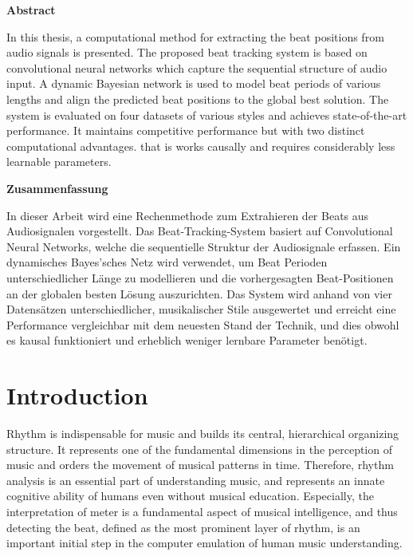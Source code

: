 \documentclass{scrartcl}
\begin{document}
\newpage 
\begin{center} 
\textsf{\textbf{Abstract}}
\end{center}

In this thesis, a computational method for extracting the beat positions from audio signals is presented. The proposed beat tracking system is based on convolutional neural networks which capture the sequential structure of audio input. A dynamic Bayesian network is used to model beat periods of various lengths and align the predicted beat positions to the global best solution. The system is evaluated on four datasets of various styles and achieves state-of-the-art performance. It maintains competitive performance but with two distinct computational advantages. that is works causally and requires considerably less learnable parameters.  


\vspace{15em}

\begin{center} 
\textsf{\textbf{Zusammenfassung}}
\end{center}

In dieser Arbeit wird eine Rechenmethode zum Extrahieren der Beats aus Audiosignalen vorgestellt. Das Beat-Tracking-System basiert auf Convolutional Neural Networks, welche die sequentielle Struktur der Audiosignale erfassen. Ein dynamisches Bayes'sches Netz wird verwendet, um Beat Perioden unterschiedlicher Länge zu modellieren und die vorhergesagten Beat-Positionen an der globalen besten Lösung auszurichten. Das System wird anhand von vier Datensätzen unterschiedlicher, musikalischer Stile ausgewertet und erreicht eine Performance vergleichbar mit dem neuesten Stand der Technik, und dies obwohl es kausal funktioniert und erheblich weniger lernbare Parameter benötigt.

\newpage

\tableofcontents
\newpage


\section{Introduction}
\label{sec:introduction}

Rhythm is indispensable for music and builds its central, hierarchical organizing structure. It represents one of the fundamental dimensions in the perception of music and orders the movement of musical patterns in time. Therefore, rhythm analysis is an essential part of understanding music, and represents an innate cognitive ability of humans even without musical education. Especially, the interpretation of meter is a fundamental aspect of musical intelligence, and thus detecting the beat, defined as the most prominent layer of rhythm, is an important initial step in the computer emulation of human music understanding. 
\end{document}
